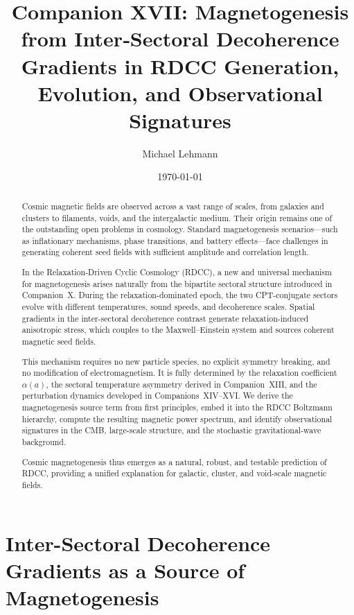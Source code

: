 \documentclass[11pt,a4paper]{article}
\title{\textbf{Companion XVII: Magnetogenesis from Inter‑Sectoral Decoherence Gradients in RDCC  
Generation, Evolution, and Observational Signatures}}
\author[1]{Michael Lehmann}
\affil[1]{\small Independent Researcher, Relaxation-Driven Cyclic Cosmology (RDCC) Framework\\
\texttt{mi.lehmann@gmx.de}}
\date{\small \today}
\begin{document}
\maketitle

\begin{abstract}
Cosmic magnetic fields are observed across a vast range of scales, from galaxies and clusters to filaments, voids, and the intergalactic medium. Their origin remains one of the outstanding open problems in cosmology. Standard magnetogenesis scenarios—such as inflationary mechanisms, phase transitions, and battery effects—face challenges in generating coherent seed fields with sufficient amplitude and correlation length.

In the Relaxation-Driven Cyclic Cosmology (RDCC), a new and universal mechanism for magnetogenesis arises naturally from the bipartite sectoral structure introduced in Companion~X. During the relaxation-dominated epoch, the two CPT-conjugate sectors evolve with different temperatures, sound speeds, and decoherence scales. Spatial gradients in the inter-sectoral decoherence contrast generate relaxation-induced anisotropic stress, which couples to the Maxwell–Einstein system and sources coherent magnetic seed fields.

This mechanism requires no new particle species, no explicit symmetry breaking, and no modification of electromagnetism. It is fully determined by the relaxation coefficient $\alpha(a)$, the sectoral temperature asymmetry derived in Companion~XIII, and the perturbation dynamics developed in Companions~XIV–XVI. We derive the magnetogenesis source term from first principles, embed it into the RDCC Boltzmann hierarchy, compute the resulting magnetic power spectrum, and identify observational signatures in the CMB, large-scale structure, and the stochastic gravitational-wave background.

Cosmic magnetogenesis thus emerges as a natural, robust, and testable prediction of RDCC, providing a unified explanation for galactic, cluster, and void-scale magnetic fields.
\end{abstract}
\section{Inter-Sectoral Decoherence Gradients as a Source of Magnetogenesis}
\end{document}
